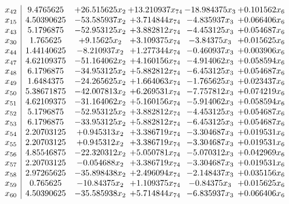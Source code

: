 \documentclass[11pt]{article}
\begin{document}
\[\begin{array}{c| c c@{\hskip 2pt} c@{\hskip 2pt} c@{\hskip 2pt} c@{\hskip 2pt} }
 x_{42}   &  9.4765625 & + 26.515625 x_{2} & + 13.210937 x_{74} & -18.984375 x_{3} & + 0.101562 x_{6}\\
 x_{15}   &  4.50390625 & -53.585937 x_{2} & + 3.714844 x_{74} & -4.835937 x_{3} & + 0.066406 x_{6}\\
 x_{43}   &  5.1796875 & -52.953125 x_{2} & + 3.882812 x_{74} & -4.453125 x_{3} & + 0.054687 x_{6}\\
 x_{30}   &  1.765625 & + 9.15625 x_{2} & + 3.109375 x_{74} & -3.84375 x_{3} & + 0.015625 x_{6}\\
 x_{44}   &  1.44140625 & -8.210937 x_{2} & + 1.277344 x_{74} & -0.460937 x_{3} & + 0.003906 x_{6}\\
 x_{47}   &  4.62109375 & -51.164062 x_{2} & + 4.160156 x_{74} & -4.914062 x_{3} & + 0.058594 x_{6}\\
 x_{48}   &  6.1796875 & -34.953125 x_{2} & + 5.882812 x_{74} & -6.453125 x_{3} & + 0.054687 x_{6}\\
 x_{49}   &  1.6484375 & -24.265625 x_{2} & + 1.664063 x_{74} & -1.765625 x_{3} & + 0.023437 x_{6}\\
 x_{50}   &  5.38671875 & -42.007813 x_{2} & + 6.269531 x_{74} & -7.757812 x_{3} & + 0.074219 x_{6}\\
 x_{51}   &  4.62109375 & -31.164062 x_{2} & + 5.160156 x_{74} & -5.914062 x_{3} & + 0.058594 x_{6}\\
 x_{52}   &  5.1796875 & -52.953125 x_{2} & + 3.882812 x_{74} & -4.453125 x_{3} & + 0.054687 x_{6}\\
 x_{53}   &  6.1796875 & -33.953125 x_{2} & + 5.882812 x_{74} & -6.453125 x_{3} & + 0.054687 x_{6}\\
 x_{54}   &  2.20703125 & + 0.945313 x_{2} & + 3.386719 x_{74} & -3.304687 x_{3} & + 0.019531 x_{6}\\
 x_{55}   &  2.20703125 & + 0.945312 x_{2} & + 3.386719 x_{74} & -3.304687 x_{3} & + 0.019531 x_{6}\\
 x_{56}   &  4.85546875 & -22.320312 x_{2} & + 5.050781 x_{74} & -5.070312 x_{3} & + 0.042969 x_{6}\\
 x_{57}   &  2.20703125 & -0.054688 x_{2} & + 3.386719 x_{74} & -3.304687 x_{3} & + 0.019531 x_{6}\\
 x_{58}   &  2.97265625 & -35.898438 x_{2} & + 2.496094 x_{74} & -2.148437 x_{3} & + 0.035156 x_{6}\\
 x_{59}   &  0.765625 & -10.84375 x_{2} & + 1.109375 x_{74} & -0.84375 x_{3} & + 0.015625 x_{6}\\
 x_{60}   &  4.50390625 & -35.585938 x_{2} & + 5.714844 x_{74} & -6.835937 x_{3} & + 0.066406 x_{6}\\

\end{array}\]
\end{document}
